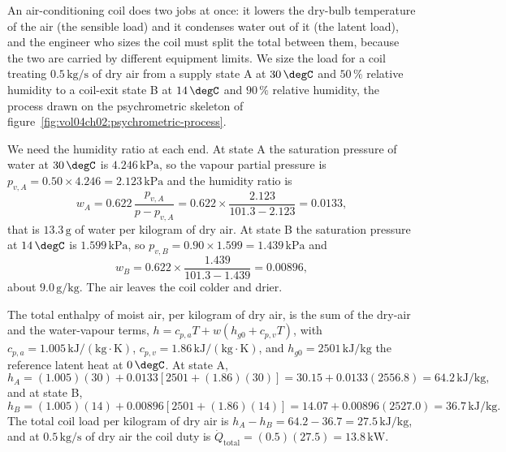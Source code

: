 An air-conditioning coil does two jobs at once: it lowers the dry-bulb
temperature of the air (the sensible load) and it condenses water out of it
(the latent load), and the engineer who sizes the coil must split the total
between them, because the two are carried by different equipment limits. We
size the load for a coil treating $0.5\,\text{kg}/\text{s}$ of dry air from
a supply state A at $30\,\degC$ and $50\,\%$ relative humidity to a coil-exit
state B at $14\,\degC$ and $90\,\%$ relative humidity, the process drawn on
the psychrometric skeleton of
figure~\ref{fig:vol04ch02:psychrometric-process}.

We need the humidity ratio at each end. At state A the saturation pressure
of water at $30\,\degC$ is $4.246\,\text{kPa}$, so the vapour partial
pressure is $p_{v,A} = 0.50\times 4.246 = 2.123\,\text{kPa}$ and the
humidity ratio is
\[
w_A = 0.622\,\frac{p_{v,A}}{p - p_{v,A}} = 0.622\times \frac{2.123}{101.3 -
2.123} = 0.0133,
\]
that is $13.3\,\text{g}$ of water per kilogram of dry air. At state B the
saturation pressure at $14\,\degC$ is $1.599\,\text{kPa}$, so $p_{v,B} =
0.90\times 1.599 = 1.439\,\text{kPa}$ and
\[
w_B = 0.622\times \frac{1.439}{101.3 - 1.439} = 0.00896,
\]
about $9.0\,\text{g}/\text{kg}$. The air leaves the coil colder and drier.

The total enthalpy of moist air, per kilogram of dry air, is the sum of the
dry-air and the water-vapour terms, $h = c_{p,a}T + w(h_{g0} + c_{p,v}T)$,
with $c_{p,a} = 1.005\,\text{kJ}/(\text{kg}\cdot\si{\kelvin})$, $c_{p,v} =
1.86\,\text{kJ}/(\text{kg}\cdot\si{\kelvin})$, and $h_{g0} = 2501\,\text{kJ}/
\text{kg}$ the reference latent heat at $0\,\degC$. At state A,
\[
h_A = (1.005)(30) + 0.0133[2501 + (1.86)(30)] = 30.15 + 0.0133(2556.8) =
64.2\,\text{kJ}/\text{kg},
\]
and at state B,
\[
h_B = (1.005)(14) + 0.00896[2501 + (1.86)(14)] = 14.07 + 0.00896(2527.0) =
36.7\,\text{kJ}/\text{kg}.
\]
The total coil load per kilogram of dry air is $h_A - h_B = 64.2 - 36.7 =
27.5\,\text{kJ}/\text{kg}$, and at $0.5\,\text{kg}/\text{s}$ of dry air the
coil duty is $\dot{Q}_{\text{total}} = (0.5)(27.5) = 13.8\,\text{kW}$.

